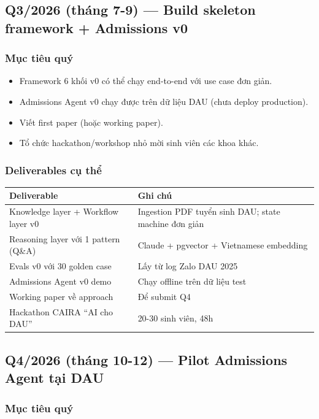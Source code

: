 \documentclass[11pt,a4paper]{article}
\begin{document}
\subsection{Q3/2026 (tháng 7-9) — Build skeleton framework + Admissions v0}

\subsubsection*{Mục tiêu quý}

\begin{itemize}
\item Framework 6 khối v0 có thể chạy end-to-end với use case đơn giản.
\item Admissions Agent v0 chạy được trên dữ liệu DAU (chưa deploy production).
\item Viết first paper (hoặc working paper).
\item Tổ chức hackathon/workshop nhỏ mời sinh viên các khoa khác.
\end{itemize}

\subsubsection*{Deliverables cụ thể}

\begin{tabularx}{\linewidth}{@{}p{4cm} X@{}}
\toprule
\textbf{Deliverable} & \textbf{Ghi chú} \\
\midrule
Knowledge layer + Workflow layer v0 & Ingestion PDF tuyển sinh DAU; state machine đơn giản \\
Reasoning layer với 1 pattern (Q\&A) & Claude + pgvector + Vietnamese embedding \\
Evals v0 với 30 golden case & Lấy từ log Zalo DAU 2025 \\
Admissions Agent v0 demo & Chạy offline trên dữ liệu test \\
Working paper về approach & Để submit Q4 \\
Hackathon CAIRA ``AI cho DAU'' & 20-30 sinh viên, 48h \\
\bottomrule
\end{tabularx}

\subsection{Q4/2026 (tháng 10-12) — Pilot Admissions Agent tại DAU}

\subsubsection*{Mục tiêu quý}
\end{document}
